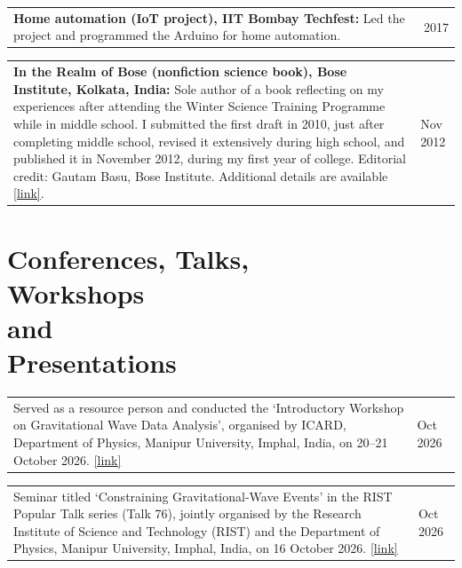 \documentclass[margin,line]{res}
\begin{document}
\begin{resume}
\begin{tabular}{@{}p{\dimexpr\linewidth-0.62in-3\tabcolsep\relax}p{0.62in}}
\textbf{Home automation (IoT project), IIT Bombay Techfest:} Led the project and programmed the Arduino for home automation. & \raggedright 2017
\end{tabular}

\begin{tabular}{@{}p{\dimexpr\linewidth-0.62in-3\tabcolsep\relax}p{0.62in}}
{\bf In the Realm of Bose (nonfiction science book), Bose Institute, Kolkata, India:} Sole author of a book reflecting on my experiences after attending the Winter Science Training Programme while in middle school. I submitted the first draft in 2010, just after completing middle school, revised it extensively during high school, and published it in November 2012, during my first year of college. Editorial credit: Gautam Basu, Bose Institute. Additional details are available \href{http://jcbose.ac.in/publication}{[link]}. & \raggedright Nov 2012
\end{tabular}

\vspace{.2in}
\section{\sc Conferences, Talks, \\Workshops \\and \\Presentations}

\begin{tabular}{@{}p{\dimexpr\linewidth-0.62in-3\tabcolsep\relax}p{0.62in}}
Served as a resource person and conducted the `Introductory Workshop on Gravitational Wave Data Analysis', organised by ICARD, Department of Physics, Manipur University, Imphal, India, on 20--21 October 2026. \href{https://drive.google.com/file/d/1pMeIWDASKQnrNQq5RWYkdBnYYqrY-PPd/view?usp=sharing}{[link]} & \raggedright Oct 2026
\end{tabular}

\begin{tabular}{@{}p{\dimexpr\linewidth-0.62in-3\tabcolsep\relax}p{0.62in}}
Seminar titled `Constraining Gravitational-Wave Events' in the RIST Popular Talk series (Talk 76), jointly organised by the Research Institute of Science and Technology (RIST) and the Department of Physics, Manipur University, Imphal, India, on 16 October 2026. \href{https://e-pao.net/epSubPageExtractor.asp?src=education.Education_Announcements.Edn_Ann_2026.RIST_Talk_76_Constraining_Gravitational_Wave_Events_20261013}{[link]} & \raggedright Oct 2026
\end{tabular}


\end{resume}
\end{document}
